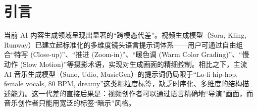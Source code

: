 \documentclass[UTF8,12pt,a4paper]{ctexart}
\begin{document}
\section{引言}

当前 AI 内容生成领域呈现出显著的“跨模态代差”。视频生成模型（Sora, Kling, Runway）已建立起标准化的多维度镜头语言提示词体系——用户可通过自由组合“特写 (Close-up)”、“推进 (Zoom-in)”、“暖色调 (Warm Color Grading)”、“慢动作 (Slow Motion)”等摄影术语，实现对生成画面的精细控制。相比之下，主流 AI 音乐生成模型（Suno, Udio, MusicGen）的提示词仍局限于“Lo-fi hip-hop, female vocals, 80 BPM, dreamy”这类粗粒度标签，缺乏时序化、多维度的结构描述能力。这一代差的直接后果是：视频创作者可以通过语言精确地“导演”画面，而音乐创作者只能用宽泛的标签“暗示”风格。
\end{document}

